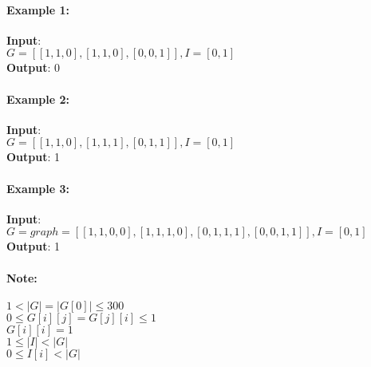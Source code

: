 \paragraph{Example 1:}
\begin{flushleft}
\textbf{Input}:
\\
$G = [[1,1,0],[1,1,0],[0,0,1]], I = [0,1]$
\\
\textbf{Output}: 0
\end{flushleft}
\paragraph{Example 2:}
\begin{flushleft}
\textbf{Input}:
\\
$G = [[1,1,0],[1,1,1],[0,1,1]], I = [0,1]$
\\
\textbf{Output}: 1
\end{flushleft}
\paragraph{Example 3:}
\begin{flushleft}
\textbf{Input}:
\\
$G = graph = [[1,1,0,0],[1,1,1,0],[0,1,1,1],[0,0,1,1]], I = [0,1]$
\\
\textbf{Output}: 1
\end{flushleft}
\paragraph{Note:}
\begin{flushleft}
$1 < |G| = |G[0]| \leq 300$
\\
$0 \leq G[i][j] = G[j][i] \leq 1$
\\
$G[i][i] = 1$
\\
$1 \leq  |I| < |G|$
\\
$0 \leq I[i] <|G|$
\end{flushleft}
